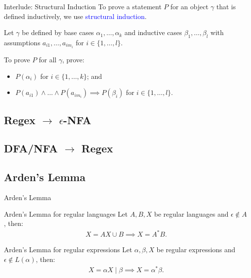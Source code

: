 \documentclass{beamer}
\def\padding{\vspace{0.5cm}}
\def\b{\textcolor{blue}}
\begin{document}
\begin{frame}{Interlude: Structural Induction}
    To prove a statement $P$ for an object $\gamma$ that is defined inductively, we use \b{structural induction}.\pause\padding

    Let $\gamma$ be defined by base cases $\alpha_1, \dots, \alpha_k$ and inductive cases $\beta_1, \dots, \beta_l$ with assumptions $a_{i1}, \dots, a_{im_i}$ for $i \in \{1, \dots, l\}$.\pause\padding

    To prove $P$ for all $\gamma$, prove:
    \begin{itemize}
        \item $P(\alpha_i)$ for $i \in \{1, \dots, k\}$\pause; and
        \item $P(a_{i1}) \land \dots \land P(a_{im_i}) \implies P(\beta_i)$ for $i \in \{1, \dots, l\}$.
    \end{itemize}
\end{frame}

\subsection{Regex $\to$ $\epsilon$-NFA}

\subsection{DFA/NFA $\to$ Regex}

\subsection{Arden's Lemma}

\begin{frame}{Arden's Lemma}
    \begin{theorem}{Arden's Lemma for regular languages}
        Let $A, B, X$ be regular languages and $\epsilon \not\in A$, then:
        \begin{align*}
            X = AX \cup B \implies X = A^* B.
        \end{align*}
    \end{theorem}\pause
    \begin{theorem}{Arden's Lemma for regular expressions}
        Let $\alpha, \beta, X$ be regular expressions and $\epsilon \not\in L(\alpha)$, then:
        \begin{align*}
            X = \alpha X \mid \beta \implies X = \alpha^* \beta.
        \end{align*}
    \end{theorem}
\end{frame}
\end{document}
